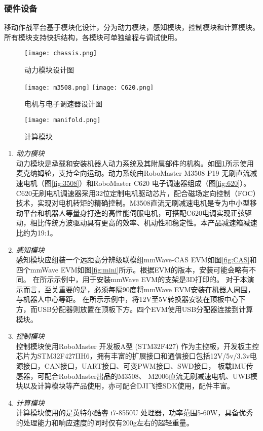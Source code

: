 \documentclass[lang=cn,11pt,a4paper]{elegantpaper}
\begin{document}
\subsubsection{硬件设备}
移动作战平台基于模块化设计，分为动力模块，感知模块，控制模块和计算模块。所有模块支持快拆结构，各模块可单独编程与调试使用。
\begin{figure}[htbp]
  \centering
  \texttt{[image: chassis.png]}
  \caption{动力模块设计图}
  \label{fig:chassis}
\end{figure}

\begin{figure}
  \centering
  {\texttt{[image: m3508.png]}}
  {\texttt{[image: C620.png]}}
  \caption{电机与电子调速器设计图}\label{ele}
\end{figure}

\begin{figure}[htbp]
  \centering
  \texttt{[image: manifold.png]}
  \caption{计算模块}
  \label{fig:manifold}
\end{figure}

\begin{enumerate}[label=\arabic*).]
  \item \textit{动力模块}\\
      动力模块是承载和安装机器人动力系统及其附属部件的机构。如图\ref{fig:chassis}所示使用麦克纳姆轮，支持全向运动。动力系统由RoboMaster M3508 P19 无刷直流减速电机（图\ref{fig:3508}）和RoboMaster C620 电子调速器组成（图\ref{fig:620}）。
      C620无刷电机调速器采用32位定制电机驱动芯片，配合磁场定向控制（FOC）技术，实现对电机转矩的精确控制。M3508直流无刷减速电机是专为中小型移动平台和机器人等量身打造的高性能伺服电机，可搭配C620电调实现正弦驱动，相比传统方波驱动具有更高的效率、机动性和稳定性。本产品减速箱减速比约为19:1。
  \item \textit{感知模块}\\
      感知模块应组装一个远距高分辨级联模组mmWave-CAS EVM如图\ref{fig:CAS}和四个mmWave EVM如图\ref{fig:mini}所示。根据EVM的版本，安装可能会略有不同。
      在所示示例中，用于安装mmWave EVM的支架是3D打印的。
      对于本演示而言，至关重要的是，必须每隔90度将mmWave EVM安装在机器人周围，与机器人中心等距。
      在所示示例中，将12V至5V转换器安装在顶板中心下方，而USB分配器则放置在顶板下方。四个EVM使用USB分配器连接到计算模块。
  \item \textit{控制模块}\\
      控制模块使用RoboMaster 开发板A型 (STM32F427) 作为主控板，开发板主控芯片为STM32F427IIH6，拥有丰富的扩展接口和通信接口包括12V/5v/3.3v电源接口，CAN接口，UART接口、可变PWM接口、SWD接口，
      板载IMU传感器，可配合RoboMaster出品的M3508、 M2006直流无刷减速电机、UWB模块以及计算模块等产品使用，亦可配合DJI飞控SDK使用，配件丰富。
  \item \textit{计算模块}\\
  计算模块使用的是英特尔酷睿 i7-8550U 处理器，功率范围5-60W，具备优秀的处理能力和响应速度的同时仅有200g左右的超轻重量。
\end{enumerate}
\end{document}
